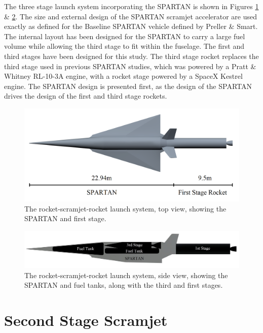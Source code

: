  The three stage launch system incorporating the SPARTAN is shown in Figures \ref{fig:NoInternal} \& \ref{fig:INTERNALS}. 
 The size and external design of the SPARTAN scramjet accelerator are used exactly as defined for the Baseline SPARTAN vehicle defined by Preller \& Smart. The internal layout has been designed for the SPARTAN to carry a large fuel volume while allowing the third stage to fit within the fuselage. 
 The first and third stages have been designed for this study. The third stage rocket replaces the third stage used in previous SPARTAN studies, which was powered by a Pratt \& Whitney RL-10-3A engine, with a rocket stage powered by a SpaceX Kestrel engine.  
The SPARTAN design is presented first, as the design of the SPARTAN drives the design of the first and third stage rockets. 


\begin{figure}[ht]
	\centering
	\includegraphics[width=0.7\linewidth]{figures/3_vehicle_design/NoInternal}
	\caption{The rocket-scramjet-rocket launch system, top view, showing the SPARTAN and first stage.}
	\label{fig:NoInternal}
\end{figure}

\begin{figure}[ht]
	\centering
	\includegraphics[width=0.7\linewidth]{figures/3_vehicle_design/INTERNALS}
	\caption{The rocket-scramjet-rocket launch system, side view, showing the SPARTAN and fuel tanks, along with the third and first stages.}
	\label{fig:INTERNALS}
\end{figure}









	
	
	\section{Second Stage Scramjet}

